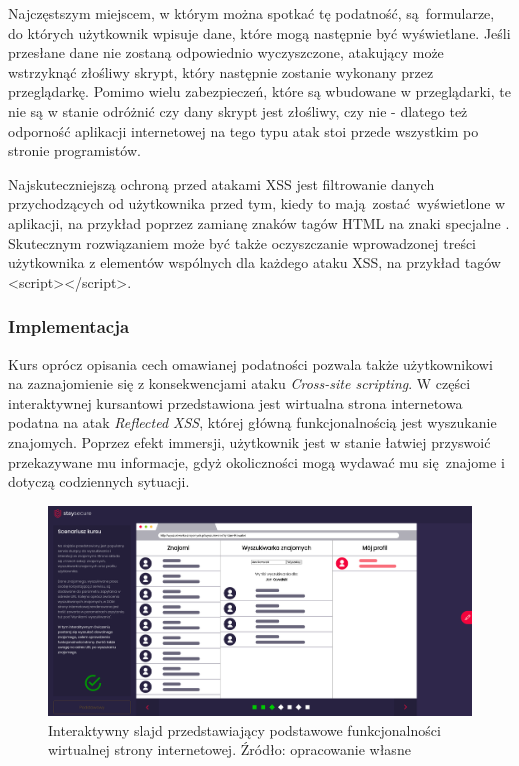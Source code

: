 \documentclass[12pt,twoside]{article}
\begin{document}
Najczęstszym miejscem, w którym można spotkać tę podatność, są formularze, do których użytkownik wpisuje dane, które mogą następnie być wyświetlane. Jeśli przesłane dane nie zostaną odpowiednio wyczyszczone, atakujący może wstrzyknąć złośliwy skrypt, który następnie zostanie wykonany przez przeglądarkę. Pomimo wielu zabezpieczeń, które są wbudowane w przeglądarki, te nie są w stanie odróżnić czy dany skrypt jest złośliwy, czy nie - dlatego też odporność aplikacji internetowej na tego typu atak stoi przede wszystkim po stronie programistów.
	
Najskuteczniejszą ochroną przed atakami XSS jest filtrowanie danych przychodzących od użytkownika przed tym, kiedy to mają zostać wyświetlone w aplikacji, na przykład poprzez zamianę znaków tagów HTML na znaki specjalne \cite{XSSSpecialTags}. Skutecznym rozwiązaniem może być także oczyszczanie wprowadzonej treści użytkownika z elementów wspólnych dla każdego ataku XSS, na przykład tagów <script></script>.
	
\subsubsection{Implementacja}

Kurs oprócz opisania cech omawianej podatności pozwala także użytkownikowi na zaznajomienie się z konsekwencjami ataku \emph{Cross-site scripting}. W części interaktywnej kursantowi przedstawiona jest wirtualna strona internetowa podatna na atak \emph{Reflected XSS}, której główną funkcjonalnością jest wyszukanie znajomych. Poprzez efekt immersji, użytkownik jest w stanie łatwiej przyswoić przekazywane mu informacje, gdyż okoliczności mogą wydawać mu się znajome i dotyczą codziennych sytuacji.

\begin{figure}[H]
	\centering
	\includegraphics[width=1\linewidth]{figures/xss-slide-screenshot1}
	\caption{Interaktywny slajd przedstawiający podstawowe funkcjonalności wirtualnej strony internetowej. Źródło: opracowanie własne}
\end{figure}
\end{document}

